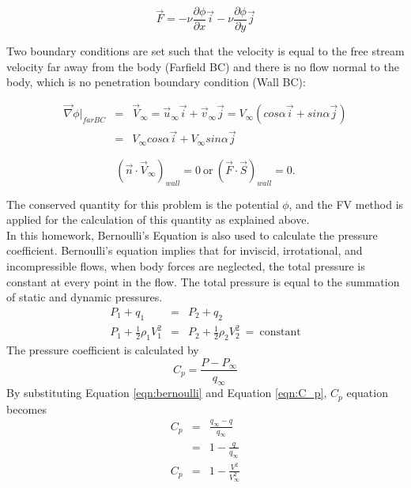 \documentclass[letterpaper,12pt]{article}
\begin{document}
\begin{equation}
	\vec{F} = -\nu\frac{\partial \phi}{\partial x}\vec{i} - \nu\frac{\partial \phi}{\partial y}\vec{j}
\end{equation}

Two boundary conditions are set such that the velocity is equal to the free stream velocity
far away from the body (Farfield BC) and there is no flow normal to the body, which is no
penetration boundary condition (Wall BC):

\begin{eqnarray}
	\vec{\nabla}\phi|_{far BC} &=& \vec{V}_{\infty} = \vec{u}_{\infty}\vec{i} + \vec{v}_{\infty}\vec{j} = V_{\infty}(cos\alpha\vec{i}+sin\alpha\vec{j})\\
	&=& V_{\infty}cos\alpha\vec{i} + V_{\infty}sin\alpha\vec{j}
\end{eqnarray}

\begin{equation}
	(\vec{n}\cdot\vec{V}_{\infty})_{wall} = 0 \:\mbox{or}\: (\vec{F}\cdot\vec{S})_{wall} = 0.
\end{equation}

The conserved quantity for this problem is the potential $\phi$, and the FV method is applied
for the calculation of this quantity as explained above.\\
\newpage
In this homework, Bernoulli's Equation is also used to calculate the pressure coefficient. Bernoulli's equation
implies that for inviscid, irrotational, and incompressible flows, when body forces are neglected,
the total pressure is constant at every point in the flow. The total pressure is equal to the summation of 
static and dynamic pressures.
\begin{eqnarray}
	P_1+q_1&=&P_2+q_2 \nonumber \\
	P_1+\frac{1}{2}\rho_1V_{1}^{2}&=&P_2+\frac{1}{2}\rho_2V_{2}^{2}\:=\:\mbox{constant}
	\label{eqn:bernoulli}
\end{eqnarray}
The pressure coefficient is calculated by
\begin{equation}
C_p=\frac{P-P_\infty}{q_\infty}
	\label{eqn:C_p}
\end{equation}
By substituting Equation \ref{eqn:bernoulli} and Equation \ref{eqn:C_p}, $C_p$ equation becomes
\begin{eqnarray}
	C_p&=&\frac{q_\infty-q}{q_{\infty}} \nonumber \\
	&=&1-\frac{q}{q_{\infty}}   \nonumber \\
	C_p&=&1-\frac{V^2}{V_{\infty}^{2}} 
	\label{eqn:C_p_new}
\end{eqnarray}
\end{document}
